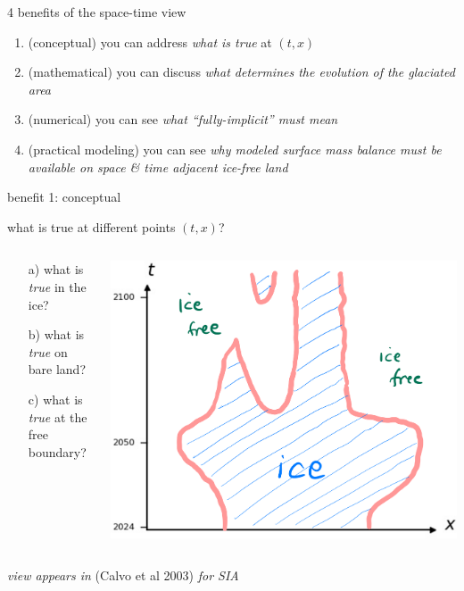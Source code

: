 \documentclass[10pt,dvipsnames]{beamer}
\begin{document}
\begin{frame}{4 benefits of the space-time view}

\begin{enumerate}
\item \alert{(conceptual)} you can address \emph{what is true} at $(t,x)$
\item \alert{(mathematical)} you can discuss \emph{what determines the evolution of the glaciated area}
\item \alert{(numerical)} you can see \emph{what ``fully-implicit'' must mean}
\item \alert{(practical modeling)} you can see \emph{why modeled surface mass balance must be available on space \& time adjacent ice-free land}
\end{enumerate}

\end{frame}


\newcommand{\viewin}[1]{{\color{blue} {\footnotesize \emph{view appears in} #1}}}

\begin{frame}{benefit 1: conceptual}

what is true at different points $(t,x)$?

\bigskip \bigskip

\begin{columns}
\begin{column}{0.3\textwidth}
\begin{itemize}
\item[a)] what is \emph{true} in the ice?
\item[b)] what is \emph{true} on bare land?
\item[c)] what is \emph{true} at the free boundary?
\end{itemize}\end{column}
\begin{column}{0.7\textwidth}
\hfill \includegraphics[width=\textwidth]{xtcrop}
\end{column}
\end{columns}

\bigskip
\viewin{(Calvo et al 2003) \emph{for SIA}}
\end{frame}
\end{document}
